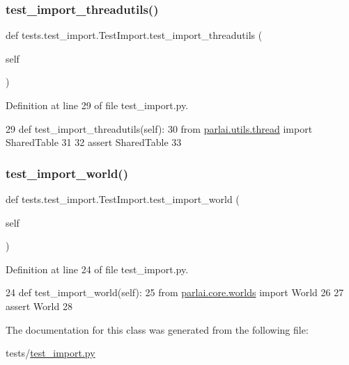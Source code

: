 \subsubsection{\texorpdfstring{test\+\_\+import\+\_\+threadutils()}{test\_import\_threadutils()}}
{\footnotesize\ttfamily def tests.\+test\+\_\+import.\+Test\+Import.\+test\+\_\+import\+\_\+threadutils (\begin{DoxyParamCaption}\item[{}]{self }\end{DoxyParamCaption})}



Definition at line 29 of file test\+\_\+import.\+py.


\begin{DoxyCode}
29     \textcolor{keyword}{def }test\_import\_threadutils(self):
30         \textcolor{keyword}{from} \hyperlink{namespaceparlai_1_1utils_1_1thread}{parlai.utils.thread} \textcolor{keyword}{import} SharedTable
31 
32         \textcolor{keyword}{assert} SharedTable
33 
\end{DoxyCode}
\mbox{\label{classtests_1_1test__import_1_1TestImport_a7eb4091dcd3395e147659ec3a49be488}} 
\subsubsection{\texorpdfstring{test\+\_\+import\+\_\+world()}{test\_import\_world()}}
{\footnotesize\ttfamily def tests.\+test\+\_\+import.\+Test\+Import.\+test\+\_\+import\+\_\+world (\begin{DoxyParamCaption}\item[{}]{self }\end{DoxyParamCaption})}



Definition at line 24 of file test\+\_\+import.\+py.


\begin{DoxyCode}
24     \textcolor{keyword}{def }test\_import\_world(self):
25         \textcolor{keyword}{from} \hyperlink{namespaceparlai_1_1core_1_1worlds}{parlai.core.worlds} \textcolor{keyword}{import} World
26 
27         \textcolor{keyword}{assert} World
28 
\end{DoxyCode}


The documentation for this class was generated from the following file\+:\begin{DoxyCompactItemize}
\item 
tests/\hyperlink{test__import_8py}{test\+\_\+import.\+py}\end{DoxyCompactItemize}
